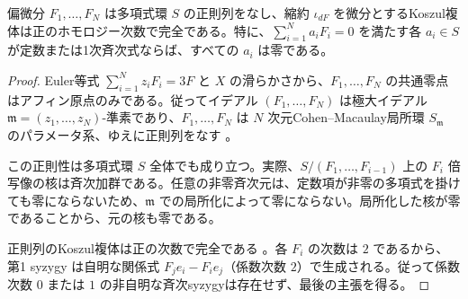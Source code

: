 \begin{lemma}\label{lem:pg-gradient}
偏微分 $F_1,\ldots,F_N$ は多項式環 $S$ の正則列をなし、縮約 $\iota_{dF}$ を微分とするKoszul複体は正のホモロジー次数で完全である。特に、$\sum_{i=1}^N a_i F_i=0$ を満たす各 $a_i\in S$ が定数または1次斉次式ならば、すべての $a_i$ は零である。
\end{lemma}
\begin{proof}
Euler等式 $\sum_{i=1}^N z_i F_i=3F$ と $X$ の滑らかさから、$F_1,\ldots,F_N$ の共通零点はアフィン原点のみである。従ってイデアル $(F_1,\ldots,F_N)$ は極大イデアル $\mathfrak m=(z_1,\ldots,z_N)$-準素であり、$F_1,\ldots,F_N$ は $N$ 次元Cohen--Macaulay局所環 $S_{\mathfrak m}$ のパラメータ系、ゆえに正則列をなす \cite[Tags~00ND, 02JN]{PStacks}。

この正則性は多項式環 $S$ 全体でも成り立つ。実際、$S/(F_1,\ldots,F_{i-1})$ 上の $F_i$ 倍写像の核は斉次加群である。任意の非零斉次元は、定数項が非零の多項式を掛けても零にならないため、$\mathfrak m$ での局所化によって零にならない。局所化した核が零であることから、元の核も零である。

正則列のKoszul複体は正の次数で完全である \cite[Tag~062F]{PStacks}。各 $F_i$ の次数は $2$ であるから、第1 syzygy は自明な関係式 $F_j e_i - F_i e_j$（係数次数 $2$）で生成される。従って係数次数 $0$ または $1$ の非自明な斉次syzygyは存在せず、最後の主張を得る。
\end{proof}

